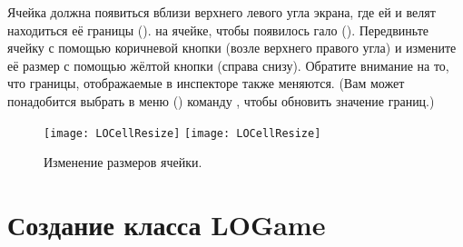 \documentclass[a4paper,10pt,twoside]{book}
\begin{document}
\dothis{
Выберите LOCell в корне окна инспектора.
Введите текст \ct{self bounds: (200@200 corner: 250@250)} в нижней панели и выполните (\menu{do it}) его. Переменная \ct{bounds} в инспекторе должна измениться.
Теперь введите текст \ct{self openInWorld} в этой малой рабочей области и выполните его тоже.}
Ячейка должна появиться вблизи верхнего левого угла экрана, где ей и велят находиться её границы ().
\metaclick на ячейке, чтобы появилось гало ().
Передвиньте ячейку с помощью коричневой кнопки (возле верхнего правого угла) и измените её размер с помощью жёлтой кнопки (справа снизу).
Обратите внимание на то, что границы, отображаемые в инспекторе также меняются.
(Вам может понадобится выбрать в меню (\actclick{}) команду , чтобы обновить значение границ.)

\begin{figure}[htbp]
\centering
\ifluluelse
	{\texttt{[image: LOCellResize]} }
	{\texttt{[image: LOCellResize]} }
\caption{Изменение размеров ячейки.}
\end{figure}


\section{Создание класса LOGame}
\end{document}
